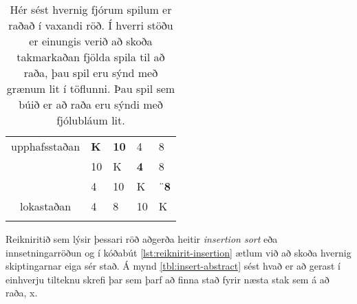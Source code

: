 \begin{table}
\begin{center}\begin{tabular}{!{\vrule width 2pt}c!{\vrule width 2pt}P|P|P|P!{\vrule width 2pt}}
	upphafsstaðan &\textbf{\textcolor{ocre}{K}} & \textbf{\textcolor{ocre}{10}} & 4 & 8 \tabularnewline
	
	& 10 & K & \textbf{\textcolor{ocre}4} & 8 
	\tabularnewline \hhline{|~|-|-|-|-|}
	
	& 4 & 10 & K & ¨\textbf{\textcolor{ocre}8} \tabularnewline
	lokastaðan & 4 & 8 & 10 & K \tabularnewline
\end{tabular}
\end{center}
\caption{Hér sést hvernig fjórum spilum er raðað í vaxandi röð. Í hverri stöðu er einungis verið að skoða takmarkaðan fjölda spila til að raða, þau spil eru sýnd með grænum lit í töflunni. Þau spil sem búið er að raða eru sýndi með fjólubláum lit.} 
\label{tbl:insert}
\end{table}

Reikniritið sem lýsir þessari röð aðgerða heitir \emph{insertion sort} eða innsetningarröðun og í kóðabút \ref{lst:reiknirit-insertion} ætlum við að skoða hvernig skiptingarnar eiga sér stað.
Á mynd \ref{tbl:insert-abstract} sést hvað er að gerast í einhverju tilteknu skrefi þar sem þarf að finna stað fyrir næsta stak sem á að raða, x.

